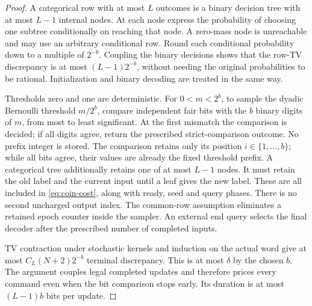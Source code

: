 \begin{proof}
A categorical row with at most $L$ outcomes is a binary decision tree
with at most $L-1$ internal nodes. At each node express the probability
of choosing one subtree conditionally on reaching that node. A zero-mass
node is unreachable and may use an arbitrary conditional row. Round each
conditional probability down to a multiple of $2^{-b}$. Coupling the
binary decisions shows that the row-TV discrepancy is at most
$(L-1)2^{-b}$, without needing the original probabilities to be rational.
Initialization and binary decoding are treated in the same way.

Thresholds zero and one are deterministic. For $0<m<2^b$,
to sample the dyadic Bernoulli threshold $m/2^b$, compare independent fair
bits with the $b$ binary digits of $m$, from most to least significant.
At the first mismatch the comparison is decided; if all digits agree,
return the prescribed strict-comparison outcome. No prefix integer is
stored. The comparison retains only its position $i\in\{1,\ldots,b\}$;
while all bits agree, their values are already the fixed threshold prefix.
A categorical tree additionally retains one of at most $L-1$ nodes.
It must retain the old label and the current input until a leaf gives
the new label. These are all included in \eqref{eq:coin-cost}, along with
ready, seed and query phases. There is no second uncharged output index.
The common-row assumption eliminates a retained epoch counter inside
the sampler. An external end query selects the final decoder after the
prescribed number of completed inputs.

TV contraction under stochastic kernels and induction on the actual
word give at most $C_L(N+2)2^{-b}$ terminal discrepancy. This is at most
$\delta$ by the chosen $b$. The argument couples legal completed updates
and therefore prices every command even when the bit comparison stops
early. Its duration is at most $(L-1)b$ bits per update.
\end{proof}

